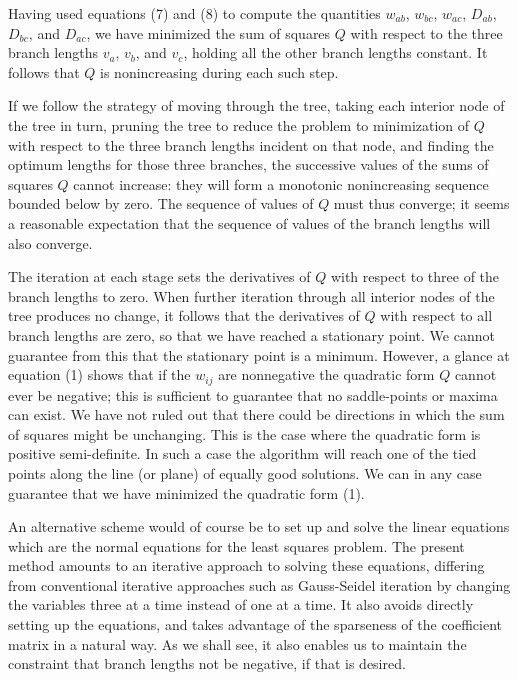 \documentclass[12pt]{article}
\begin{document}
Having used equations (7) and (8) to compute the quantities $w_{ab}$,
$w_{bc}$, $w_{ac}$, $D_{ab}$, $D_{bc}$, and $D_{ac}$, we have minimized the sum
of squares $Q$ with respect to the three branch lengths $v_a$, $v_b$, and
$v_c$, holding all the other branch lengths constant.  It follows that $Q$ is
nonincreasing during each such step.

If we follow the strategy of moving through the tree, taking each interior
node of the tree in turn, pruning the tree to reduce the problem to 
minimization of $Q$ with
respect to the three branch lengths incident on that node, and finding the
optimum lengths for those three branches, the successive values of the
sums of squares $Q$ cannot increase: they will form a monotonic nonincreasing 
sequence bounded
below by zero.  The sequence of values of $Q$ must thus converge; it seems a
reasonable expectation that the sequence of values of the branch lengths will 
also converge.

The iteration at each stage sets the derivatives of $Q$ with respect to three
of the branch lengths to zero.  When further iteration through all interior
nodes of the tree produces no change, it
follows that the derivatives of $Q$ with respect to all branch lengths are
zero, so that we have reached a stationary point.  We cannot guarantee from
this that the stationary point is a minimum.  However, a glance at equation
(1) shows that if the $w_{ij}$ are nonnegative the quadratic form $Q$ cannot ever 
be negative; 
this is sufficient to guarantee that no
saddle-points or maxima can exist.
We have not ruled out that there could be directions in which the
sum of squares might be unchanging.  This is the case where the quadratic
form is positive semi-definite.  In such a case the algorithm will
reach one of the tied points along the line (or plane) of equally good
solutions.  We can in any case guarantee that we have minimized the
quadratic form (1).

An alternative scheme would of course be to set up and solve the linear
equations which are the normal equations for the least squares problem.  The
present method amounts to an iterative approach to solving these equations,
differing from conventional iterative approaches such as Gauss-Seidel
iteration by changing the variables three at a time instead of one at a
time.  It also avoids directly setting up the equations, and takes advantage
of the sparseness of the coefficient matrix in a natural way.  As we shall
see, it also enables us to maintain the constraint that branch lengths not
be negative, if that is desired.
\bigskip
\end{document}
